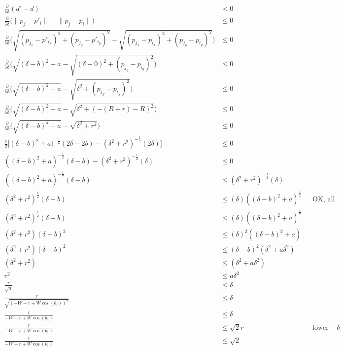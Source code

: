 \documentclass[conference]{IEEEtran}
\begin{document}
    {%
      \setlength{\belowdisplayskip}{3pt}%
      \setlength{\abovedisplayskip}{3pt}%
      \begin{align*}
        \frac{\partial}{\partial\delta}(d'-d) &< 0 \\
        \frac{\partial}{\partial\delta}\big(\lVert p_j - p'_i \rVert - \lVert p_j - p_i \rVert\big) &\leq 0 \\
        \frac{\partial}{\partial\delta}\bigg(\sqrt{(p_{j_x} - p'_{i_x})^2 + (p_{j_y} - p'_{i_y})^2} - \sqrt{(p_{j_x} - p_{i_x})^2 + (p_{j_y} - p_{i_y})^2}\bigg) &\leq 0 \\
        \frac{\partial}{\partial\delta}\bigg(\sqrt{(\delta - b)^2 + a} - \sqrt{(\delta - 0)^2 + (p_{j_y} - p_{i_y})^2}\bigg) &\leq 0 \\
        \frac{\partial}{\partial\delta}\bigg(\sqrt{(\delta - b)^2 + a} - \sqrt{\delta^2 + (p_{j_y} - p_{i_y})^2}\bigg) &\leq 0 \\
        \frac{\partial}{\partial\delta}\bigg(\sqrt{(\delta-b)^2 + a} - \sqrt{\delta^2 + (-(R+r) - R)^2}\bigg) &\leq 0 \\
        \frac{\partial}{\partial\delta}\bigg(\sqrt{(\delta-b)^2 + a} - \sqrt{\delta^2 + r^2}\bigg) &\leq 0 \\
        \frac{1}{2}\Big[(\delta-b)^2 + a)^{-\frac{1}{2}}(2\delta-2b) - (\delta^2 + r^2)^{-\frac{1}{2}}(2\delta)\Big] &\leq 0 \\
        ((\delta-b)^2 + a)^{-\frac{1}{2}}(\delta-b) - (\delta^2 + r^2)^{-\frac{1}{2}}(\delta) &\leq 0 \\
        ((\delta-b)^2 + a)^{-\frac{1}{2}}(\delta-b) &\leq (\delta^2 + r^2)^{-\frac{1}{2}}(\delta) \\
        (\delta^2 + r^2)^{\frac{1}{2}}(\delta-b) &\leq (\delta)((\delta-b)^2 + a)^{\frac{1}{2}} && \text{OK, all terms are positive} \\
        (\delta^2 + r^2)^{\frac{1}{2}}(\delta-b) &\leq (\delta)((\delta-b)^2 + a)^{\frac{1}{2}} \\
        (\delta^2 + r^2)(\delta-b)^2 &\leq (\delta)^2((\delta-b)^2 + a) \\
        (\delta^2 + r^2)(\delta-b)^2 &\leq (\delta-b)^2(\delta^2 + a\delta^2) \\
        (\delta^2 + r^2) &\leq (\delta^2 + a\delta^2) \\
        r^2 &\leq a\delta^2 \\
        \frac{r}{\sqrt{a}} &\leq \delta \\
        \frac{r}{\sqrt{(-W-r+W\cos(\theta_i))^2}} &\leq \delta \\
        \frac{r}{-W-r+W\cos(\theta_i)} &\leq \delta \\
        \frac{r}{-W-r+W\cos(\theta_i)} &\leq \sqrt{2}r && \text{lower bound on }\delta \\
        \frac{1}{-W-r+W\cos(\theta_i)} &\leq \sqrt{2} \\
      \end{align*}

}
\end{document}
